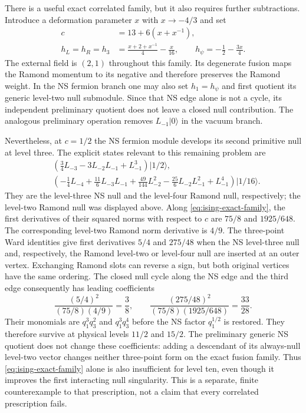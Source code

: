 There is a useful exact correlated family, but it also requires further
subtractions.  Introduce a deformation parameter $x$ with $x\to-4/3$
and set
\begin{align}
 c&=13+6(x+x^{-1}),\nonumber\\
 h_L=h_R=h_3&=\frac{x+2+x^{-1}}4-\frac{x}{16},\qquad
 h_\psi=-\frac12-\frac{3x}{4}.
 \label{eq:ising-exact-family}
\end{align}
The external field is $(2,1)$ throughout this family.  Its degenerate
fusion maps the Ramond momentum to its negative and therefore preserves
the Ramond weight.  In the NS fermion branch one may also set
$h_1=h_\psi$ and first quotient its generic level-two null submodule.
Since that NS edge alone is not a cycle, its independent preliminary
quotient does not leave a closed null contribution.  The analogous
preliminary operation removes $L_{-1}|0\rangle$ in the vacuum branch.

Nevertheless, at $c=1/2$ the NS fermion module develops its second
primitive null at level three.  The explicit states relevant to this
remaining problem are
\begin{align}
 &\left(\tfrac34 L_{-3}-3L_{-2}L_{-1}+L_{-1}^3\right)|1/2\rangle,
 \nonumber\\
 &\left(-\tfrac14 L_{-4}+\tfrac{11}{6}L_{-3}L_{-1}
 +\tfrac{49}{144}L_{-2}^2-\tfrac{25}{6}L_{-2}L_{-1}^2
 +L_{-1}^4\right)|1/16\rangle.
\end{align}
They are the level-three NS null and the level-four Ramond null,
respectively; the level-two Ramond null was displayed above.  Along
\eqref{eq:ising-exact-family}, the first derivatives of their squared
norms with respect to $c$ are $75/8$ and $1925/648$.  The corresponding
level-two Ramond norm derivative is $4/9$.  The three-point Ward
identities give first derivatives $5/4$ and $275/48$ when the NS
level-three null and, respectively, the Ramond level-two or level-four
null are inserted at an outer vertex.  Exchanging Ramond slots can
reverse a sign, but both original vertices have the same ordering.
The closed null cycle along the NS edge and the third edge consequently
has leading coefficients
\begin{equation}
 \frac{(5/4)^2}{(75/8)(4/9)}=\frac38,
 \qquad
 \frac{(275/48)^2}{(75/8)(1925/648)}=\frac{33}{28}.
\end{equation}
Their monomials are $q_1^3q_3^2$ and $q_1^3q_3^4$ before the
NS factor $q_1^{1/2}$ is restored.  They therefore survive at physical
levels $11/2$ and $15/2$.  The preliminary generic NS quotient does not
change these coefficients: adding a descendant of its always-null
level-two vector changes neither three-point form on the exact fusion
family.  Thus \eqref{eq:ising-exact-family} alone is also insufficient
for level ten, even though it improves the first interacting null
singularity.  This is a separate, finite counterexample to that
prescription, not a claim that every correlated prescription fails.

